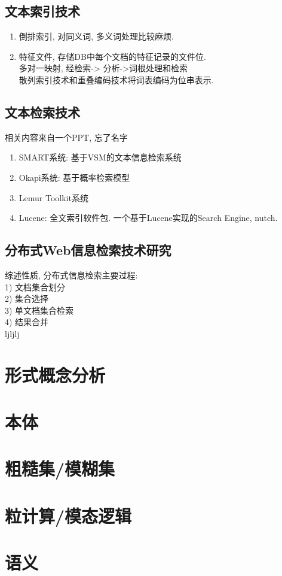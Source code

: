 \documentclass[a4paper,10pt,english]{article}
\begin{document}
\subsection {文本索引技术}
\begin{enumerate}
\item {倒排索引}, 对同义词, 多义词处理比较麻烦.
\item {特征文件}, 存储DB中每个文档的特征记录的文件位. \\
多对一映射, 经检索-> 分析->词根处理和检索\\
散列索引技术和重叠编码技术将词表编码为位串表示.
\end{enumerate}

\subsection {文本检索技术}
相关内容来自一个PPT, 忘了名字
\begin{enumerate}
\item {SMART系统}: 基于VSM的文本信息检索系统
\item {Okapi系统}: 基于概率检索模型
\item {Lemur Toolkit系统}
\item {Lucene}: 全文索引软件包. 一个基于Lucene实现的Search Engine, nutch.
\end{enumerate}

\subsection {分布式Web信息检索技术研究}
综述性质, 分布式信息检索主要过程: \\
1) 文档集合划分 \\
2) 集合选择 \\
3) 单文档集合检索 \\
4) 结果合并\\
ljljlj

\section {形式概念分析}

\section {本体}

\section {粗糙集/模糊集}

\section {粒计算/模态逻辑}

\section {语义}
\end{document}

